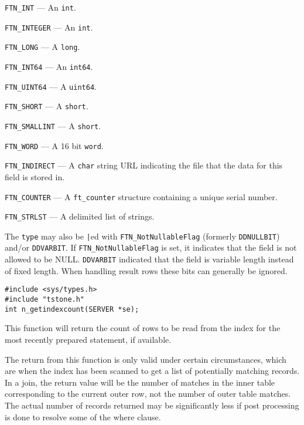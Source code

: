\verb`FTN_INT` --- An \verb`int`.

\verb`FTN_INTEGER` --- An \verb`int`.

\verb`FTN_LONG` --- A \verb`long`.

\verb`FTN_INT64` --- An \verb`int64`.

\verb`FTN_UINT64` --- A \verb`uint64`.

\verb`FTN_SHORT` --- A \verb`short`.

\verb`FTN_SMALLINT` --- A \verb`short`.

\verb`FTN_WORD` --- A 16 bit \verb`word`.

\verb`FTN_INDIRECT` --- A \verb`char` string URL indicating the file that
the data for this field is stored in.

\verb`FTN_COUNTER` --- A \verb`ft_counter` structure containing a unique serial
number.

\verb`FTN_STRLST` --- A delimited list of strings.

The \verb`type` may also be \verb`|`ed with \verb`FTN_NotNullableFlag` (formerly \verb`DDNULLBIT`) and/or
\verb`DDVARBIT`.  If \verb`FTN_NotNullableFlag` is set, it indicates that the field is not
allowed to be NULL. \verb`DDVARBIT` indicated that the field is
variable length instead of fixed length. When handling result rows
these bits can generally be ignored.



\SYNOPSIS
\begin{verbatim}
#include <sys/types.h>
#include "tstone.h"
int n_getindexcount(SERVER *se);
\end{verbatim}

\DESCRIPTION

This function will return the count of rows to be read from the index
for the most recently prepared statement, if available.

\CAVEATS

The return from this function is only valid under certain circumstances,
which are when the index has been scanned to get a list of potentially
matching records.  In a join, the return value will be the number of
matches in the inner table corresponding to the current outer row, not
the number of outer table matches.  The actual number of records returned
may be significantly less if post processing is done to resolve some
of the where clause.

